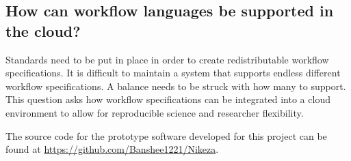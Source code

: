 \subsection{How can workflow languages be supported in the cloud?}
Standards need to be put in place in order to create redistributable workflow specifications. It is difficult to maintain a system that supports endless different workflow specifications. A balance needs to be struck with how many to support. This question asks how workflow specifications can be integrated into a cloud environment to allow for reproducible science and researcher flexibility.

The source code for the prototype software developed for this project can be found at \url{https://github.com/Banshee1221/Nikeza}.